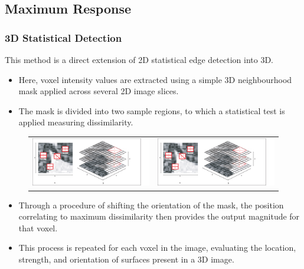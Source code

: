 \documentclass[9pt]{beamer}
\begin{document}
 \subsection{Maximum Response}
 \begin{frame}
	\frametitle{ 3D Statistical Detection}
This method is a direct extension of 2D statistical edge detection into 3D.\\
	\begin{itemize}
		\item Here, voxel intensity values are extracted using a simple 3D neighbourhood mask applied across several 2D image slices. 
		\item The mask is divided into two sample regions, to which a statistical test is applied measuring dissimilarity.
	 \end{itemize}
		 \begin{figure}
		 \begin{tabular}{c c}
		 \includegraphics[scale=0.25]{2D3Dmasks1}& \includegraphics[scale=0.25]{2D3Dmasks2}
		 \end{tabular}
		 \end{figure}
	 \begin{itemize}
	 \item Through a procedure of shifting the orientation of the mask, the position correlating to maximum dissimilarity then provides the output magnitude for that voxel.
	 \item This process is repeated for each voxel in the image, evaluating the location, strength, and orientation of surfaces present in a 3D image.
	 \end{itemize}
 \end{frame}
\end{document}
